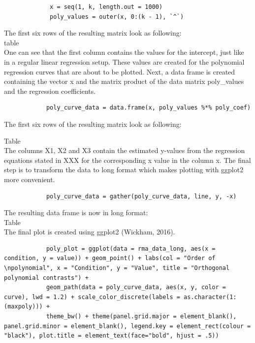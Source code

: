 \documentclass[11pt]{article}
\begin{document}
		\begin{lstlisting}
			 x = seq(1, k, length.out = 1000)
			 poly_values = outer(x, 0:(k - 1), `^`)
		\end{lstlisting}
		
		The first six rows of the resulting matrix look as following:\\
		
		
		table\\
		
		
		One can see that the first column contains the values for the intercept, just like in a regular linear regression setup. These values are created for the polynomial regression curves that are about to be plotted. Next, a data frame is created containing the vector x and the matrix product of the data matrix poly\_values and the regression coefficients.\\
		
		\begin{lstlisting}
			poly_curve_data = data.frame(x, poly_values %*% poly_coef)
		\end{lstlisting}
		
		The first six rows of the resulting matrix look as following:
		
		Table\\
		
		The columns X1, X2 and X3 contain the estimated y-values from the regression equations stated in XXX for the corresponding x value in the column x.
		The final step is to transform the data to long format which makes plotting with ggplot2 more convenient.\\
		
		\begin{lstlisting}
			poly_curve_data = gather(poly_curve_data, line, y, -x)
		\end{lstlisting}
		
		The resulting data frame is now in long format:\\
		
		Table\\
		
		The final plot is created using ggplot2 (Wickham, 2016).
		
		\begin{lstlisting}
			poly_plot = ggplot(data = rma_data_long, aes(x = condition, y = value)) + geom_point() + labs(col = "Order of \npolynomial", x = "Condition", y = "Value", title = "Orthogonal polynomial contrasts") + 
			geom_path(data = poly_curve_data, aes(x, y, color = curve), lwd = 1.2) + scale_color_discrete(labels = as.character(1:(maxpoly))) +
			theme_bw() + theme(panel.grid.major = element_blank(), panel.grid.minor = element_blank(), legend.key = element_rect(colour = "black"), plot.title = element_text(face="bold", hjust = .5))
		\end{lstlisting}
		
\end{document}
